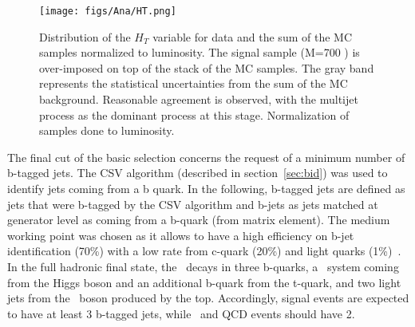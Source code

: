 \begin{figure}[!Hhtbp]
  \begin{center}
    \texttt{[image: figs/Ana/HT.png]}
    \caption{Distribution of the $H_{T}$ variable for data and the sum of the MC samples normalized to luminosity. The signal sample (M=700 \GeVcc) is over-imposed on top of the stack of the MC samples. The gray band represents the statistical uncertainties from the sum of the MC background. Reasonable agreement is observed, with the multijet process as the dominant process at this stage. Normalization of samples done to luminosity.}
    \label{fig:HT}
  \end{center}
\end{figure}

The final cut of the basic selection concerns the request of a minimum number of b-tagged jets. The CSV algorithm (described in section~\ref{sec:bid}) was used to identify jets coming from a b quark. In the following, b-tagged jets are defined as jets that were b-tagged by the CSV algorithm and b-jets as jets matched at generator level as coming from a b-quark (from matrix element). The medium working point was chosen as it allows to have a high efficiency on b-jet identification (70\%) with a low rate from c-quark (20\%) and light quarks (1\%)~\cite{Chatrchyan:2012jua, CMS:2013vea}. In the full hadronic final state, the \Tp~decays in three b-quarks, a \bbbar~system coming from the Higgs boson and an additional b-quark from the t-quark, and two light jets from the \W~boson produced by the top. Accordingly, signal events are expected to have at least 3 b-tagged jets, while \ttbar~and QCD events should have 2.

